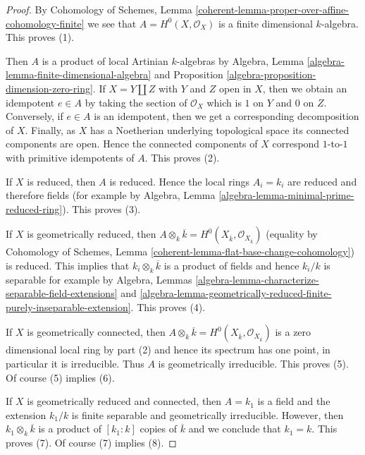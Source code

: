 \begin{proof}
By Cohomology of Schemes, Lemma
\ref{coherent-lemma-proper-over-affine-cohomology-finite}
we see that $A = H^0(X, \mathcal{O}_X)$ is a finite dimensional
$k$-algebra. This proves (1).

\medskip\noindent
Then $A$ is a product of local Artinian $k$-algebras by
Algebra, Lemma \ref{algebra-lemma-finite-dimensional-algebra} and
Proposition \ref{algebra-proposition-dimension-zero-ring}.
If $X = Y \amalg Z$ with $Y$ and $Z$ open in $X$, then we obtain
an idempotent $e \in A$ by taking the section of $\mathcal{O}_X$
which is $1$ on $Y$ and $0$ on $Z$. Conversely, if $e \in A$
is an idempotent, then we get a corresponding decomposition of $X$.
Finally, as $X$ has a Noetherian underlying topological space
its connected components are open. Hence the connected components
of $X$ correspond $1$-to-$1$ with primitive idempotents of $A$.
This proves (2).

\medskip\noindent
If $X$ is reduced, then $A$ is reduced. Hence the local rings $A_i = k_i$
are reduced and therefore fields (for example by
Algebra, Lemma \ref{algebra-lemma-minimal-prime-reduced-ring}).
This proves (3).

\medskip\noindent
If $X$ is geometrically reduced, then
$A \otimes_k \overline{k} =
H^0(X_{\overline{k}}, \mathcal{O}_{X_{\overline{k}}})$
(equality by Cohomology of Schemes, Lemma
\ref{coherent-lemma-flat-base-change-cohomology}) is reduced.
This implies that $k_i \otimes_k \overline{k}$ is a product
of fields and hence $k_i/k$ is separable for example by
Algebra,
Lemmas \ref{algebra-lemma-characterize-separable-field-extensions} and
\ref{algebra-lemma-geometrically-reduced-finite-purely-inseparable-extension}.
This proves (4).

\medskip\noindent
If $X$ is geometrically connected, then $A \otimes_k \overline{k} =
H^0(X_{\overline{k}}, \mathcal{O}_{X_{\overline{k}}})$
is a zero dimensional local ring by part (2) and hence its
spectrum has one point, in particular it is irreducible.
Thus $A$ is geometrically irreducible. This proves (5).
Of course (5) implies (6).

\medskip\noindent
If $X$ is geometrically reduced and connected, then
$A = k_1$ is a field and the extension $k_1/k$ is finite separable and
geometrically irreducible. However, then $k_1 \otimes_k \overline{k}$
is a product of $[k_1 : k]$ copies of $\overline{k}$ and we conclude
that $k_1 = k$. This proves (7). Of course (7) implies (8).
\end{proof}

